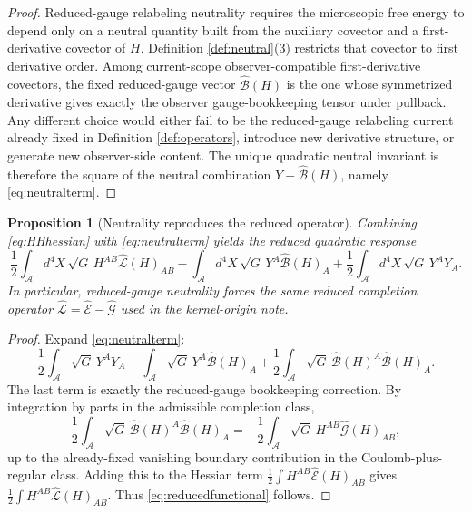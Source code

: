\documentclass[11pt]{article}
\newcommand{\Sub}{\mathcal A}
\newcommand{\SubEinLin}{\widehat{\mathcal E}}
\newcommand{\SubGaugeVec}{\widehat{\mathcal B}}
\newcommand{\SubGaugeBook}{\widehat{\mathcal G}}
\newcommand{\SubReducedEin}{\widehat{\mathcal L}}
\newcommand{\GaugeAux}{Y}
\newtheorem{proposition}{Proposition}
\begin{document}
\begin{proof}
Reduced-gauge relabeling neutrality requires the microscopic free energy to depend only on a neutral quantity built from the auxiliary covector and a first-derivative covector of \(H\). Definition \ref{def:neutral}(3) restricts that covector to first derivative order. Among current-scope observer-compatible first-derivative covectors, the fixed reduced-gauge vector \(\SubGaugeVec(H)\) is the one whose symmetrized derivative gives exactly the observer gauge-bookkeeping tensor under pullback. Any different choice would either fail to be the reduced-gauge relabeling current already fixed in Definition \ref{def:operators}, introduce new derivative structure, or generate new observer-side content. The unique quadratic neutral invariant is therefore the square of the neutral combination \(\GaugeAux-\SubGaugeVec(H)\), namely \eqref{eq:neutralterm}.
\end{proof}

\begin{proposition}[Neutrality reproduces the reduced operator]
\label{prop:reduced}
Combining \eqref{eq:HHhessian} with \eqref{eq:neutralterm} yields the reduced quadratic response
\begin{equation}
\frac12
\int_{\Sub} d^4X\,\sqrt{G}\,
H^{AB}\SubReducedEin(H)_{AB}
-\int_{\Sub} d^4X\,\sqrt{G}\,
\GaugeAux^A\SubGaugeVec(H)_A
+\frac12
\int_{\Sub} d^4X\,\sqrt{G}\,
\GaugeAux^A\GaugeAux_A.
\label{eq:reducedfunctional}
\end{equation}
In particular, reduced-gauge neutrality forces the same reduced completion operator \(\SubReducedEin=\SubEinLin-\SubGaugeBook\) used in the kernel-origin note.
\end{proposition}

\begin{proof}
Expand \eqref{eq:neutralterm}:
\[
\frac12\int_{\Sub}\sqrt{G}\,\GaugeAux^A\GaugeAux_A
-\int_{\Sub}\sqrt{G}\,\GaugeAux^A\SubGaugeVec(H)_A
+\frac12\int_{\Sub}\sqrt{G}\,\SubGaugeVec(H)^A\SubGaugeVec(H)_A.
\]
The last term is exactly the reduced-gauge bookkeeping correction. By integration by parts in the admissible completion class,
\[
\frac12\int_{\Sub}\sqrt{G}\,\SubGaugeVec(H)^A\SubGaugeVec(H)_A
=
-\frac12\int_{\Sub}\sqrt{G}\,H^{AB}\SubGaugeBook(H)_{AB},
\]
up to the already-fixed vanishing boundary contribution in the Coulomb-plus-regular class. Adding this to the Hessian term \(\frac12\int H^{AB}\SubEinLin(H)_{AB}\) gives \(\frac12\int H^{AB}\SubReducedEin(H)_{AB}\). Thus \eqref{eq:reducedfunctional} follows.
\end{proof}
\end{document}
